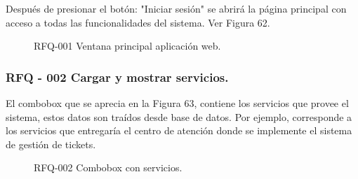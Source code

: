 Después de presionar el botón: "Iniciar sesión" se abrirá la página principal con acceso a todas las funcionalidades del sistema. Ver Figura 62.

\begin{figure}[H]
\centering
\setlength\fboxsep{0pt}
\setlength\fboxrule{0.5pt}
\caption{RFQ-001 Ventana principal aplicación web.}
\label{rfq001}
\end{figure}


\subsubsection{RFQ - 002 Cargar y mostrar servicios.}

El combobox que se aprecia en la Figura 63, contiene los servicios que provee el sistema, estos datos son traídos desde base de datos. Por ejemplo, corresponde a los servicios que entregaría el centro de atención donde se implemente el sistema de gestión de tickets.\\ 

\begin{figure}[H]
\centering
\setlength\fboxsep{0pt}
\setlength\fboxrule{0.5pt}
\caption{RFQ-002 Combobox con servicios.}
\label{rfq002}
\end{figure}

